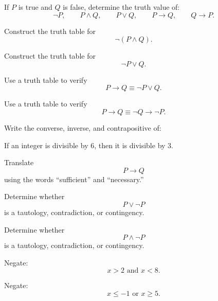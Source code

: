 \begin{exercise}[1]
If \(P\) is true and \(Q\) is false, determine the truth value of:
\[ \neg P,\qquad P\land Q,\qquad P\lor Q,\qquad P\to Q,\qquad Q\to P. \]
\end{exercise}

\begin{exercise}[1]
Construct the truth table for
\[ \neg(P\land Q). \]
\end{exercise}

\begin{exercise}[1]
Construct the truth table for
\[ \neg P\lor Q. \]
\end{exercise}

\begin{exercise}[2]
Use a truth table to verify
\[ P\to Q\equiv\neg P\lor Q. \]
\end{exercise}

\begin{exercise}[2]
Use a truth table to verify
\[ P\to Q\equiv\neg Q\to\neg P. \]
\end{exercise}

\begin{exercise}[1]
Write the converse, inverse, and contrapositive of:

\begin{center}
If an integer is divisible by \(6\), then it is divisible by \(3\).
\end{center}
\end{exercise}

\begin{exercise}[1]
Translate
\[ P\to Q \]
using the words ``sufficient'' and ``necessary.''
\end{exercise}

\begin{exercise}[1]
Determine whether
\[ P\lor\neg P \]
is a tautology, contradiction, or contingency.
\end{exercise}

\begin{exercise}[1]
Determine whether
\[ P\land\neg P \]
is a tautology, contradiction, or contingency.
\end{exercise}

\begin{exercise}[2]
Negate:
\[ x>2\text{ and }x<8. \]
\end{exercise}

\begin{exercise}[2]
Negate:
\[ x\leq-1\text{ or }x\geq5. \]
\end{exercise}

